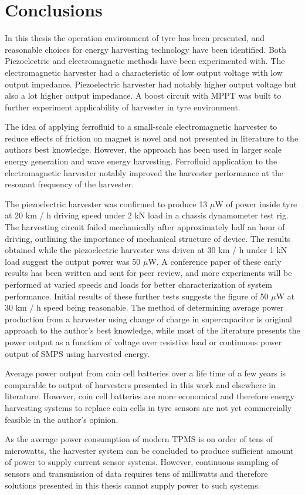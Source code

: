 \section{Conclusions}\label{sect:conclusions}
In this thesis the operation environment of tyre has been presented, and reasonable choices for energy harvesting technology have been identified. Both Piezoelectric and electromagnetic methods have been experimented with. The electromagnetic harvester had a characteristic of low output voltage with low output impedance. Piezoelectric harvester had notably higher output voltage but also a lot higher output impedance. A boost circuit with MPPT was built to further experiment applicability of harvester in tyre environment. 

The idea of applying ferrofluid to a small-scale electromagnetic harvester to reduce effects of friction on magnet is novel and not presented in literature to the authors best knowledge. However, the approach has been used in larger scale energy generation and wave energy harvesting. Ferrofluid application to the electromagnetic harvester notably improved the harvester performance at the resonant frequency of the harvester. 

The piezoelectric harvester was confirmed to produce 13 $\mu$W of power inside tyre at 20 km / h driving speed under 2 kN load in a chassis dynamometer test rig. The harvesting circuit failed mechanically after approximately half an hour of driving, outlining the importance of mechanical structure of device. The results obtained while the piezoelectric harvester was driven at 30 km / h under 1 kN load suggest the output power was 50 $\mu$W. A conference paper of these early results has been written and sent for peer review, and more experiments will be performed at varied speeds and loads for better characterization of system performance. Initial results of these further tests suggests the figure of 50 $\mu$W at 30 km / h speed being reasonable. The method of determining average power production from a harvester using change of charge in supercapacitor is original approach to the author's best knowledge, while most of the literature presents the power output as a function of voltage over resistive load or continuous power output of SMPS using harvested energy.  

Average power output from coin cell batteries over a life time of a few years is comparable to output of harvesters presented in this work and elsewhere in literature. However, coin cell batteries are more economical and therefore energy harvesting systems to replace coin cells in tyre sensors are not yet commercially feasible in the author's opinion.

As the average power consumption of modern TPMS is on order of tens of microwatts, the harvester system can be concluded to produce sufficient amount of power to supply current sensor systems. However, continuous sampling of sensors and transmission of data requires tens of milliwatts and therefore solutions presented in this thesis cannot supply power to such systems. 
